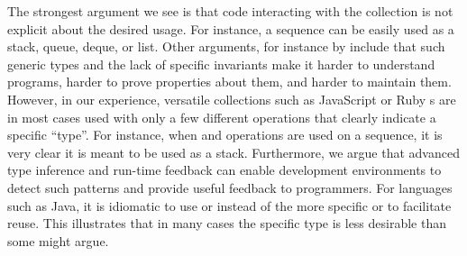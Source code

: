 \documentclass[sigconf, 10pt]{acmart}
\begin{document}
The strongest argument we see is
that code interacting with the collection is not explicit about
the desired usage.
For instance, a sequence can be easily used as a stack, queue, deque, or list.
Other arguments, for instance by \citet{PeytonJones:1996:BTC}
include that such generic types and the lack of specific invariants
make it harder to understand programs, harder to prove properties about them,
and harder to maintain them.
%
However, in our experience, versatile collections
such as JavaScript or Ruby s are in most cases
used with only a few different operations
that clearly indicate a specific ``type''.
For instance, when  and  operations are used on a sequence,
it is very clear it is meant to be used as a stack.
Furthermore, we argue that advanced type inference and run-time feedback
can enable development environments to detect such patterns
and provide useful feedback to programmers.
%
For languages such as Java, it is idiomatic to use  or  instead of the more specific  or  to facilitate reuse.
This illustrates that in many cases the specific type
is less desirable than some might argue.
\end{document}
